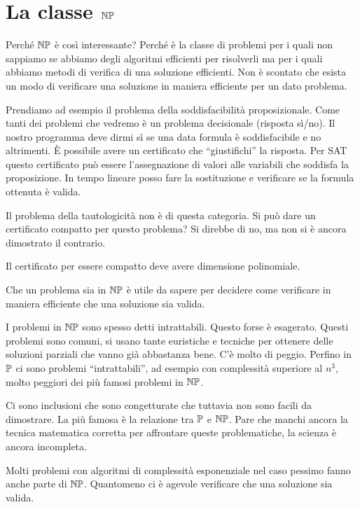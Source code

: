 \section{La classe $\mathbb{NP}$}

Perché $\mathbb{NP}$ è così interessante? Perché è la classe di problemi per i quali non sappiamo se
abbiamo degli algoritmi efficienti per risolverli ma per i quali abbiamo metodi di verifica di una
soluzione efficienti. Non è scontato che esista un modo di verificare una soluzione in maniera
efficiente per un dato problema.

Prendiamo ad esempio il problema della soddisfacibilità proposizionale. Come tanti dei problemi che
vedremo è un problema decisionale (risposta sì/no). Il nostro programma deve dirmi sì se una data
formula è soddisfacibile e no altrimenti. È possibile avere un certificato che ``giustifichi'' la
risposta. Per SAT questo certificato può essere l'assegnazione di valori alle variabili che
soddisfa la proposizione. In tempo lineare posso fare la sostituzione e verificare se la formula
ottenuta è valida.

Il problema della tautologicità non è di questa categoria. Si può dare un certificato compatto
per questo problema? Si direbbe di no, ma non si è ancora dimostrato il contrario.

Il certificato per essere compatto deve avere dimensione polinomiale.

Che un problema sia in $\mathbb{NP}$ è utile da sapere per decidere come verificare in maniera efficiente che
una soluzione sia valida.

I problemi in $\mathbb{NP}$ sono spesso detti intrattabili. Questo forse è esagerato. Questi problemi
sono comuni, si usano tante euristiche e tecniche per ottenere delle soluzioni parziali che vanno
già abbastanza bene. C'è molto di peggio. Perfino in $\mathbb{P}$ ci sono problemi ``intrattabili'',
ad esempio con complessità superiore al $n^{3}$, molto peggiori dei più famosi problemi in
$\mathbb{NP}$.

Ci sono inclusioni che sono congetturate che tuttavia non sono facili da dimostrare. La più famosa
è la relazione tra $\mathbb{P}$ e $\mathbb{NP}$. Pare che manchi ancora la tecnica matematica corretta
per affrontare queste problematiche, la scienza è ancora incompleta.

Molti problemi con algoritmi di complessità esponenziale nel caso pessimo fanno anche parte di
$\mathbb{NP}$. Quantomeno ci è agevole verificare che una soluzione sia valida.

